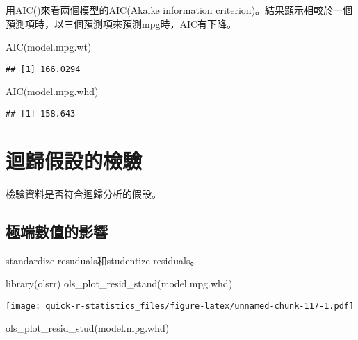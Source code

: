 \documentclass[
]{book}
\newenvironment{Shaded}{\begin{snugshade}}{\end{snugshade}}
\newcommand{\FunctionTok}[1]{\textcolor[rgb]{0.00,0.00,0.00}{#1}}
\newcommand{\NormalTok}[1]{#1}
\begin{document}
用AIC()來看兩個模型的AIC(Akaike information criterion)。結果顯示相較於一個預測項時，以三個預測項來預測mpg時，AIC有下降。

\begin{Shaded}
\begin{Highlighting}[]
\FunctionTok{AIC}\NormalTok{(model.mpg.wt)}
\end{Highlighting}
\end{Shaded}

\begin{verbatim}
## [1] 166.0294
\end{verbatim}

\begin{Shaded}
\begin{Highlighting}[]
\FunctionTok{AIC}\NormalTok{(model.mpg.whd)}
\end{Highlighting}
\end{Shaded}

\begin{verbatim}
## [1] 158.643
\end{verbatim}

\hypertarget{ux8ff4ux6b78ux5047ux8a2dux7684ux6aa2ux9a57}{%
\section{迴歸假設的檢驗}\label{ux8ff4ux6b78ux5047ux8a2dux7684ux6aa2ux9a57}}

檢驗資料是否符合迴歸分析的假設。

\hypertarget{ux6975ux7aefux6578ux503cux7684ux5f71ux97ff}{%
\subsection{極端數值的影響}\label{ux6975ux7aefux6578ux503cux7684ux5f71ux97ff}}

standardize resuduals和studentize residuals。

\begin{Shaded}
\begin{Highlighting}[]
\FunctionTok{library}\NormalTok{(olsrr)}
\FunctionTok{ols\_plot\_resid\_stand}\NormalTok{(model.mpg.whd)}
\end{Highlighting}
\end{Shaded}

\texttt{[image: quick-r-statistics\_files/figure-latex/unnamed-chunk-117-1.pdf]}

\begin{Shaded}
\begin{Highlighting}[]
\FunctionTok{ols\_plot\_resid\_stud}\NormalTok{(model.mpg.whd)}
\end{Highlighting}
\end{Shaded}
\end{document}
